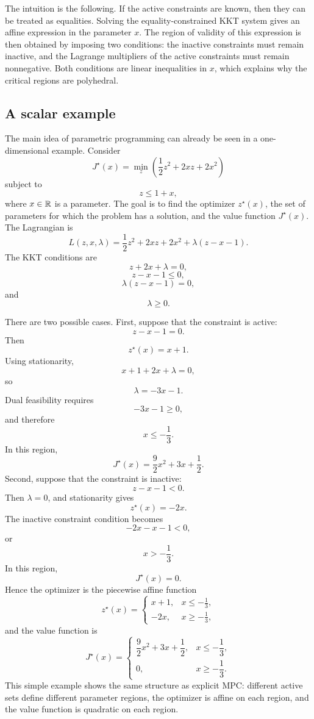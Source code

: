 The intuition is the following. If the active constraints are known, then they can be treated
as equalities. Solving the equality-constrained KKT system gives an affine expression in the
parameter \(x\). The region of validity of this expression is then obtained by imposing two
conditions: the inactive constraints must remain inactive, and the Lagrange multipliers of the
active constraints must remain nonnegative. Both conditions are linear inequalities in \(x\),
which explains why the critical regions are polyhedral.

\subsection{A scalar example}

The main idea of parametric programming can already be seen in a one-dimensional example.
Consider
\[
    J^\star(x)
    =
    \min_z
    \left(
        \frac{1}{2}z^2 + 2xz + 2x^2
    \right)
\]
subject to
\[
    z\leq 1+x,
\]
where \(x\in\mathbb{R}\) is a parameter. The goal is to find the optimizer \(z^\star(x)\), the set of
parameters for which the problem has a solution, and the value function \(J^\star(x)\).\\

The Lagrangian is
\[
    L(z,x,\lambda)
    =
    \frac{1}{2}z^2 + 2xz + 2x^2
    +
    \lambda(z-x-1).
\]
The KKT conditions are
\[
    z+2x+\lambda=0,
\]
\[
    z-x-1\leq 0,
\]
\[
    \lambda(z-x-1)=0,
\]
and
\[
    \lambda\geq 0.
\]

There are two possible cases. First, suppose that the constraint is active:
\[
    z-x-1=0.
\]
Then
\[
    z^\star(x)=x+1.
\]
Using stationarity,
\[
    x+1+2x+\lambda=0,
\]
so
\[
    \lambda=-3x-1.
\]
Dual feasibility requires
\[
    -3x-1\geq 0,
\]
and therefore
\[
    x\leq -\frac{1}{3}.
\]
In this region,
\[
    J^\star(x)
    =
    \frac{9}{2}x^2+3x+\frac{1}{2}.
\]
Second, suppose that the constraint is inactive:
\[
    z-x-1<0.
\]
Then \(\lambda=0\), and stationarity gives
\[
    z^\star(x)=-2x.
\]
The inactive constraint condition becomes
\[
    -2x-x-1<0,
\]
or
\[
    x>-\frac{1}{3}.
\]
In this region,
\[
    J^\star(x)=0.
\]
Hence the optimizer is the piecewise affine function
\[
    z^\star(x)
    =
    \begin{cases}
        x+1, & x\leq -\frac{1}{3},\\[2mm]
        -2x, & x\geq -\frac{1}{3},
    \end{cases}
\]
and the value function is
\[
    J^\star(x)
    =
    \begin{cases}
        \dfrac{9}{2}x^2+3x+\dfrac{1}{2},
        & x\leq -\dfrac{1}{3},\\[3mm]
        0,
        & x\geq -\dfrac{1}{3}.
    \end{cases}
\]
This simple example shows the same structure as explicit MPC: different active sets define
different parameter regions, the optimizer is affine on each region, and the value function is
quadratic on each region.

